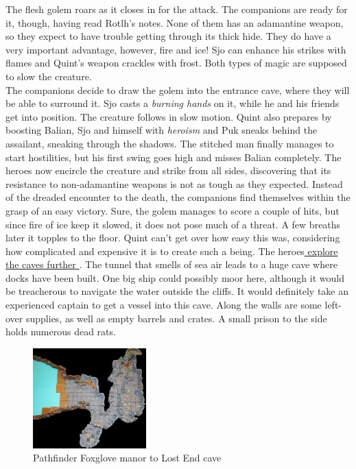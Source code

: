 The flesh golem roars as it closes in for the attack. The companions are ready for it, though, having read Rotlh's notes. None of them has an adamantine weapon, so they expect to have trouble getting through its thick hide. They do have a very important advantage, however, fire and ice! Sjo can enhance his strikes with flames and Quint's weapon crackles with frost. Both types of magic are supposed to slow the creature.\\

The companions decide to draw the golem into the entrance cave, where they will be able to surround it. Sjo casts a {\itshape burning hands} on it, while he and his friends get into position. The creature follows in slow motion. Quint also prepares by boosting Balian, Sjo and himself with  {\itshape heroism} and Puk sneaks behind the assailant, sneaking through the shadows. The stitched man finally manages to start hostilities, but his first swing goes high and misses Balian completely. The heroes now encircle the creature and strike from all sides, discovering that its resistance to non-adamantine weapons is not as tough as they expected. Instead of the dreaded encounter to the death, the companions find themselves within the grasp of an easy victory. Sure, the golem manages to score a couple of hits, but since fire of ice keep it slowed, it does not pose much of a threat. A few breaths later it topples to the floor. Quint can't get over how easy this was, considering how complicated and expensive it is to create such a being. The heroes\hyperref[fig:Pathfinder-Foxglove-manor-to-Lost-End-cave-515531738]{ explore the caves further } . The tunnel that smells of sea air leads to a huge cave where docks have been built. One big ship could possibly moor here, although it would be treacherous to navigate the water outside the cliffs. It would definitely take an experienced captain to get a vessel into this cave. Along the walls are some left-over supplies, as well as empty barrels and crates. A small prison to the side holds numerous dead rats. \\

\begin{figure}[h]
	\centering
	\includegraphics[width=0.39\textwidth]{images/Pathfinder-Foxglove-manor-to-Lost-End-cave-515531738.jpg}
	\caption{Pathfinder Foxglove manor to Lost End cave}
	\label{fig:Pathfinder-Foxglove-manor-to-Lost-End-cave-515531738}
\end{figure}

